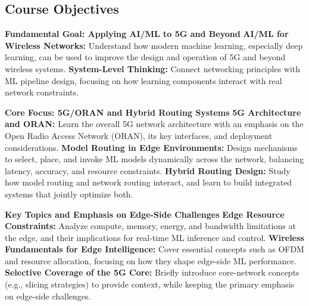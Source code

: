
\subsection*{Course Objectives} 

\begin{outline}
  \1 \textbf{Fundamental Goal: Applying AI/ML to 5G and Beyond}
    \2 \textbf{AI/ML for Wireless Networks:} Understand how modern machine learning, especially deep learning, can be used to improve the design and operation of 5G and beyond wireless systems.
    \2 \textbf{System-Level Thinking:} Connect networking principles with ML pipeline design, focusing on how learning components interact with real network constraints.

  \1 \textbf{Core Focus: 5G/ORAN and Hybrid Routing Systems}
    \2 \textbf{5G Architecture and ORAN:} Learn the overall 5G network architecture with an emphasis on the Open Radio Access Network (ORAN), its key interfaces, and deployment considerations.
    \2 \textbf{Model Routing in Edge Environments:} Design mechanisms to select, place, and invoke ML models dynamically across the network, balancing latency, accuracy, and resource constraints.
    \2 \textbf{Hybrid Routing Design:} Study how model routing and network routing interact, and learn to build integrated systems that jointly optimize both.

  \1 \textbf{Key Topics and Emphasis on Edge-Side Challenges}
    \2 \textbf{Edge Resource Constraints:} Analyze compute, memory, energy, and bandwidth limitations at the edge, and their implications for real-time ML inference and control.
    \2 \textbf{Wireless Fundamentals for Edge Intelligence:} Cover essential concepts such as OFDM and resource allocation, focusing on how they shape edge-side ML performance.
    \2 \textbf{Selective Coverage of the 5G Core:} Briefly introduce core-network concepts (e.g., slicing strategies) to provide context, while keeping the primary emphasis on edge-side challenges.
\end{outline}




